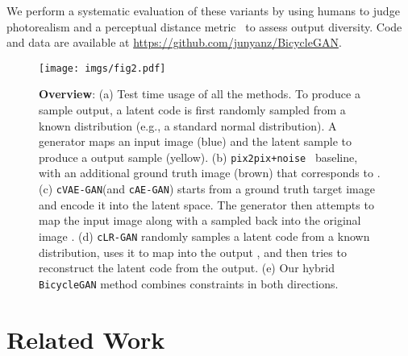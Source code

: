 \documentclass{article}
\newcommand{\ppn}{\texttt{pix2pix+noise}\xspace}
\newcommand{\cinfogan}{\texttt{cLR-GAN}\xspace}
\newcommand{\cae}{\texttt{cAE-GAN}\xspace}
\newcommand{\cvaegan}{\texttt{cVAE-GAN}\xspace}
\newcommand{\bicycle}{\texttt{BicycleGAN}\xspace} \newcommand{\G}{G\xspace}
\begin{document}
We perform a systematic evaluation of these variants by using humans to judge photorealism and a perceptual distance metric~\cite{zhang2018unreasonable} to assess output diversity. Code and data are available at \url{https://github.com/junyanz/BicycleGAN}. 
\begin{figure}
  \centering
  \texttt{[image: imgs/fig2.pdf]}
\caption{\small \textbf{Overview}: (a) Test time usage of all the methods. To produce a sample output, a latent code  is first randomly sampled from a known distribution (e.g., a standard normal distribution). A generator  maps an input image  (blue) and the latent sample  to produce a output sample  (yellow). (b) \ppn~\citep{isola2016image} baseline, with an additional ground truth image  (brown) that corresponds to . (c)  \cvaegan (and \cae) starts from a ground truth target image  and encode it into the latent space. The generator then attempts to map the input image  along with a sampled  back into the original image . (d) \cinfogan randomly samples a latent code from a known distribution, uses it to map  into the output , and then tries to reconstruct the latent code from the output. (e) Our hybrid \bicycle method combines constraints in both directions.
}
\vspace{-5mm}
\label{fig:fig2}
\end{figure}

\section{Related Work}
\end{document}
